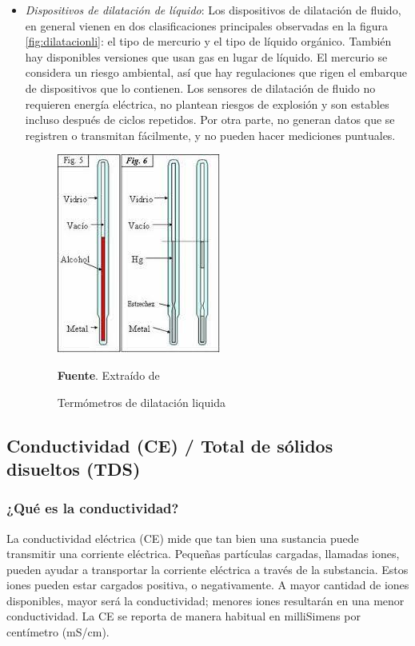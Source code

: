 \begin{itemize}
    \item \textit{Dispositivos de dilatación de l\'iquido}: Los dispositivos de dilatación de fluido, en general vienen en dos clasificaciones principales observadas en la figura \ref{fig:dilatacionli}: el tipo de mercurio y el tipo de líquido orgánico. También hay disponibles versiones que usan gas en lugar de líquido. El mercurio se considera un riesgo ambiental, así que hay regulaciones que rigen el embarque de dispositivos que lo contienen. Los sensores de dilatación de fluido no requieren energía eléctrica, no plantean riesgos de explosión y son estables incluso después de ciclos repetidos. Por otra parte, no generan datos que se registren o transmitan fácilmente, y no pueden hacer mediciones puntuales.\cite{omega_engineering_inc_medicion_nodate}
    \begin{figure}[ht]
        \centering
        \label{fig:dilatacion_li}
        \includegraphics[scale=0.6]{Imagenes/cap2/Dilatacion Liquida.jpg}\\
        \bigskip
        \caption { Term\'ometros de dilataci\'on liquida  } \textbf{Fuente}. Extra\'ido de \cite{equipos_y_laboratorio_de_colombia_termometros_nodate}
    \end{figure}

\end{itemize}
    

\subsection{Conductividad (CE) / Total de sólidos disueltos (TDS)}

\subsubsection{¿Qué es la conductividad?}
La conductividad eléctrica (CE) mide que tan bien una sustancia puede transmitir una corriente eléctrica. 
Pequeñas partículas cargadas, llamadas iones, pueden ayudar a transportar la corriente eléctrica a través de la substancia. 
Estos iones pueden estar cargados positiva, o negativamente. A mayor cantidad de iones disponibles, mayor será la conductividad; menores iones resultarán en una menor conductividad. 
La CE se reporta de manera habitual en milliSimens por centímetro (mS/cm).

